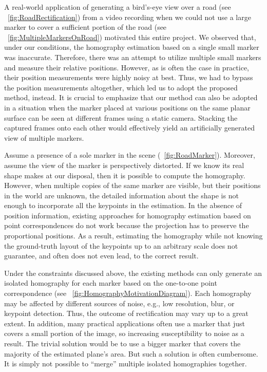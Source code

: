 A real-world application of generating a bird's-eye view over a road (see \figstr{}~\ref{fig:RoadRectification}) from a video recording when we could not use a large marker to cover a sufficient portion of the road (see \figstr{}~\ref{fig:MultipleMarkersOnRoad}) motivated this entire project. We observed that, under our conditions, the homography estimation based on a single small marker was inaccurate. Therefore, there was an attempt to utilize multiple small markers and measure their relative positions. However, as is often the case in practice, their position measurements were highly noisy at best. Thus, we had to bypass the position measurements altogether, which led us to adopt the proposed method, instead. It is crucial to emphasize that our method can also be adopted in a situation when the marker placed at various positions on the same planar surface can be seen at different frames using a static camera. Stacking the captured frames onto each other would effectively yield an artificially generated view of multiple markers.

Assume a presence of a sole marker in the scene (\figstr{}~\ref{fig:RoadMarker}). Moreover, assume the view of the marker is perspectively distorted. If we know its real shape makes at our disposal, then it is possible to compute the homography. However, when multiple copies of the same marker are visible, but their positions in the world are unknown, the detailed information about the shape is not enough to incorporate all the keypoints in the estimation. In the absence of position information, existing approaches for homography estimation based on point correspondences do not work because the projection has to preserve the proportional positions. As a result, estimating the homography while not knowing the ground-truth layout of the keypoints up to an arbitrary scale does not guarantee, and often does not even lead, to the correct result.

Under the constraints discussed above, the existing methods can only generate an isolated homography for each marker based on the one-to-one point correspondence (see \figstr{}~\ref{fig:HomographyMotivationDiagram}). Each homography may be affected by different sources of noise, e.g., low resolution, blur, or keypoint detection. Thus, the outcome of rectification may vary up to a great extent. In addition, many practical applications often use a marker that just covers a small portion of the image, so increasing susceptibility to noise as a result. The trivial solution would be to use a bigger marker that covers the majority of the estimated plane's area. But such a solution is often cumbersome. It is simply not possible to ``merge'' multiple isolated homographies together.

